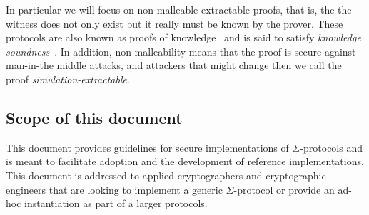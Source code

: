 \documentclass[11pt]{article}
\begin{document}

In particular we will focus on non-malleable extractable proofs, that is, the the witness does not only exist but it really must be known by the prover.
These protocols are also known as proofs of knowledge~\cite{STOC:GolMicRac85,STOC:FeiFiaSha87,C:BelGol92} and is said to satisfy \emph{knowledge soundness}~\cite{damgard04}. In addition, non-malleability means that the proof is secure against man-in-the middle attacks, and attackers that might change  then we call the proof \emph{simulation-extractable}.


\subsection{Scope of this document}

This document provides guidelines for secure implementations of $\Sigma$-protocols and is meant to facilitate adoption and the development of reference implementations.
This document is addressed to applied cryptographers and cryptographic engineers that are looking to implement a generic
$\Sigma$-protocol or provide an ad-hoc instantiation as part of a larger protocols.
\end{document}
